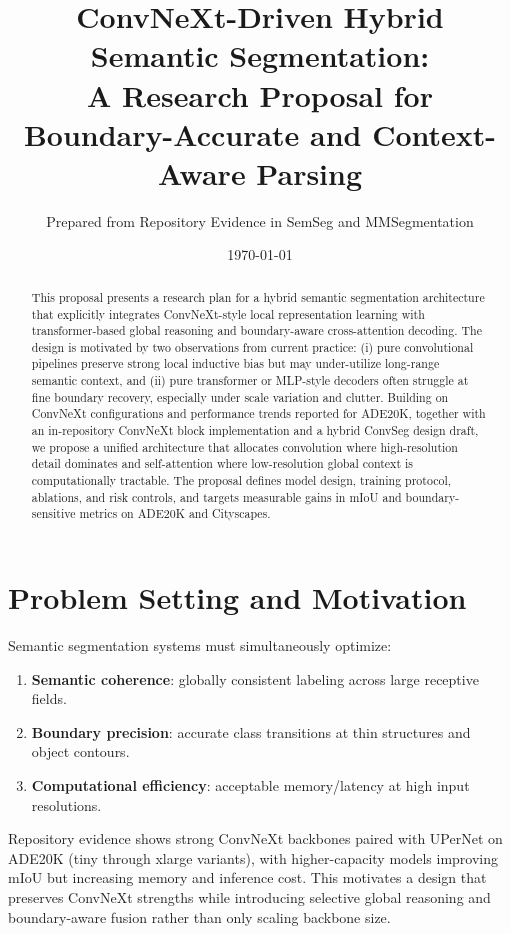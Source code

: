 \documentclass[11pt]{article}
\title{ConvNeXt-Driven Hybrid Semantic Segmentation:\\
A Research Proposal for Boundary-Accurate and Context-Aware Parsing}
\author{Prepared from Repository Evidence in SemSeg and MMSegmentation}
\date{\today}
\begin{document}
\maketitle
\begin{abstract}
This proposal presents a research plan for a hybrid semantic segmentation architecture that explicitly integrates ConvNeXt-style local representation learning with transformer-based global reasoning and boundary-aware cross-attention decoding. The design is motivated by two observations from current practice: (i) pure convolutional pipelines preserve strong local inductive bias but may under-utilize long-range semantic context, and (ii) pure transformer or MLP-style decoders often struggle at fine boundary recovery, especially under scale variation and clutter. Building on ConvNeXt configurations and performance trends reported for ADE20K, together with an in-repository ConvNeXt block implementation and a hybrid ConvSeg design draft, we propose a unified architecture that allocates convolution where high-resolution detail dominates and self-attention where low-resolution global context is computationally tractable. The proposal defines model design, training protocol, ablations, and risk controls, and targets measurable gains in mIoU and boundary-sensitive metrics on ADE20K and Cityscapes.
\end{abstract}

\section{Problem Setting and Motivation}
Semantic segmentation systems must simultaneously optimize:
\begin{enumerate}[leftmargin=1.4em]
    \item \textbf{Semantic coherence}: globally consistent labeling across large receptive fields.
    \item \textbf{Boundary precision}: accurate class transitions at thin structures and object contours.
    \item \textbf{Computational efficiency}: acceptable memory/latency at high input resolutions.
\end{enumerate}

Repository evidence shows strong ConvNeXt backbones paired with UPerNet on ADE20K (tiny through xlarge variants), with higher-capacity models improving mIoU but increasing memory and inference cost. This motivates a design that preserves ConvNeXt strengths while introducing selective global reasoning and boundary-aware fusion rather than only scaling backbone size.
\end{document}
